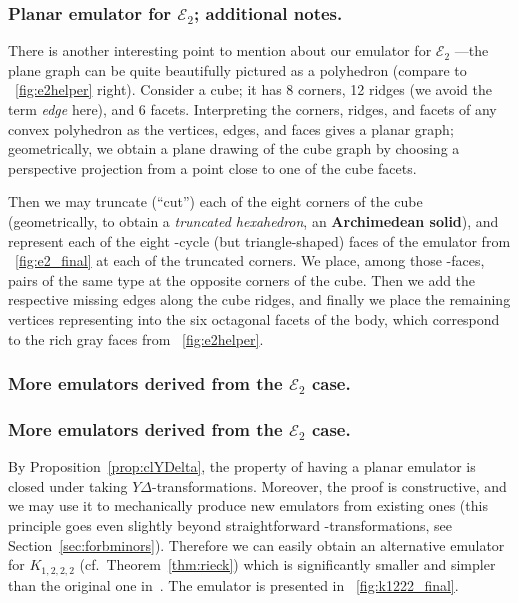\documentclass[envcountsect,envcountsame]{llncs}
\renewenvironment{accumulate}{}{}
\newcommand{\KKK}{\ensuremath{K_{1,2,2,2}}\xspace}
\newcommand{\EE}{\ensuremath{\mathcal{E}_2}\xspace}
\begin{document}
\begin{onlyaccum}
\subsubsection*{Planar emulator for \EE; additional notes.}
\end{onlyaccum}
\begin{accumulate}
\medskip
There is another interesting point to mention about our emulator for \EE
---the plane graph can be quite beautifully pictured as a polyhedron
(compare to \figurename~\ref{fig:e2helper} right).
Consider a cube; it has 8 corners, 12 ridges (we avoid the term \emph{edge}
here), and 6 facets. Interpreting the corners, ridges, and facets of any
convex polyhedron as the vertices, edges, and faces gives a planar graph;
geometrically, we obtain a plane drawing of the cube graph 
by choosing a perspective projection from a point close to one of the cube facets.

Then we may truncate (``cut'') each of the eight corners of the cube
(geometrically, to obtain a \emph{truncated hexahedron}, an {\bf Archimedean solid}),
and represent each of the eight -cycle (but triangle-shaped) faces of the
emulator from \figurename~\ref{fig:e2_final} at each of the truncated
corners.
We place, among those -faces, pairs of the same type at the
opposite corners of the cube. 
Then we add the respective missing edges along the cube ridges, 
and finally we place the remaining vertices representing  into the
six octagonal facets of the body, which correspond to the rich gray faces
from \figurename~\ref{fig:e2helper}.

\end{accumulate}




\subsubsection*{More emulators derived from the \EE case.}
\begin{onlyaccum}
\subsubsection*{More emulators derived from the \EE case.}
\end{onlyaccum}

By Proposition~\ref{prop:clYDelta}, the property of having a planar
emulator is closed under taking {\ensuremath{Y\!\Delta}}-transformations. 
Moreover, the proof is constructive, and we may use it to mechanically
produce new emulators from existing ones (this principle goes even slightly beyond
straightforward -transformations, see Section~\ref{sec:forbminors}).
Therefore we can easily obtain an alternative emulator for \KKK
(cf.~Theorem~\ref{thm:rieck}) which is significantly smaller and simpler
than the original one in~\cite{cit:rieck}.
The emulator is presented in \figurename~\ref{fig:k1222_final}.
\end{document}
